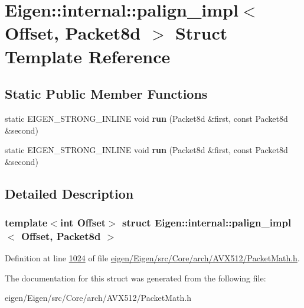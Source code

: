 \hypertarget{struct_eigen_1_1internal_1_1palign__impl_3_01_offset_00_01_packet8d_01_4}{}\section{Eigen\+:\+:internal\+:\+:palign\+\_\+impl$<$ Offset, Packet8d $>$ Struct Template Reference}
\label{struct_eigen_1_1internal_1_1palign__impl_3_01_offset_00_01_packet8d_01_4}
\subsection*{Static Public Member Functions}
\begin{DoxyCompactItemize}
\item 
\mbox{\label{struct_eigen_1_1internal_1_1palign__impl_3_01_offset_00_01_packet8d_01_4_a75559aeaf9f507a75e08b853abcfa555}} 
static E\+I\+G\+E\+N\+\_\+\+S\+T\+R\+O\+N\+G\+\_\+\+I\+N\+L\+I\+NE void {\bfseries run} (Packet8d \&first, const Packet8d \&second)
\item 
\mbox{\label{struct_eigen_1_1internal_1_1palign__impl_3_01_offset_00_01_packet8d_01_4_a75559aeaf9f507a75e08b853abcfa555}} 
static E\+I\+G\+E\+N\+\_\+\+S\+T\+R\+O\+N\+G\+\_\+\+I\+N\+L\+I\+NE void {\bfseries run} (Packet8d \&first, const Packet8d \&second)
\end{DoxyCompactItemize}


\subsection{Detailed Description}
\subsubsection*{template$<$int Offset$>$\newline
struct Eigen\+::internal\+::palign\+\_\+impl$<$ Offset, Packet8d $>$}



Definition at line \hyperlink{eigen_2_eigen_2src_2_core_2arch_2_a_v_x512_2_packet_math_8h_source_l01024}{1024} of file \hyperlink{eigen_2_eigen_2src_2_core_2arch_2_a_v_x512_2_packet_math_8h_source}{eigen/\+Eigen/src/\+Core/arch/\+A\+V\+X512/\+Packet\+Math.\+h}.



The documentation for this struct was generated from the following file\+:\begin{DoxyCompactItemize}
\item 
eigen/\+Eigen/src/\+Core/arch/\+A\+V\+X512/\+Packet\+Math.\+h\end{DoxyCompactItemize}
